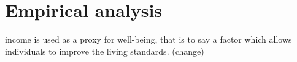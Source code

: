 \documentclass[\main/main.tex]{subfiles}
\begin{document}
\chapter{Empirical analysis}


income is used as a proxy for well-being, that is to say a factor which allows individuals to improve the living standards. (change)







\end{document}
